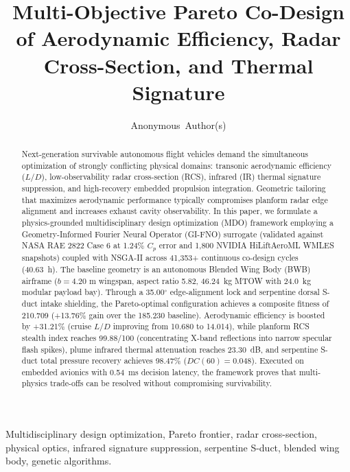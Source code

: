 \documentclass[journal,10pt,twocolumn]{IEEEtran}
\begin{document}
\title{Multi-Objective Pareto Co-Design of Aerodynamic Efficiency, Radar Cross-Section, and Thermal Signature}

\author{Anonymous~Author(s)}


\maketitle

\begin{abstract}
Next-generation survivable autonomous flight vehicles demand the simultaneous optimization of strongly conflicting physical domains: transonic aerodynamic efficiency ($L/D$), low-observability radar cross-section (RCS), infrared (IR) thermal signature suppression, and high-recovery embedded propulsion integration. Geometric tailoring that maximizes aerodynamic performance typically compromises planform radar edge alignment and increases exhaust cavity observability. In this paper, we formulate a physics-grounded multidisciplinary design optimization (MDO) framework employing a Geometry-Informed Fourier Neural Operator (GI-FNO) surrogate (validated against NASA RAE 2822 Case 6 at 1.24\% $C_p$ error and 1,800 NVIDIA HiLiftAeroML WMLES snapshots) coupled with NSGA-II across 41,353+ continuous co-design cycles (40.63~h). The baseline geometry is an autonomous Blended Wing Body (BWB) airframe ($b = 4.20\text{ m}$ wingspan, aspect ratio 5.82, 46.24~kg MTOW with 24.0~kg modular payload bay). Through a 35.00$^\circ$ edge-alignment lock and serpentine dorsal S-duct intake shielding, the Pareto-optimal configuration achieves a composite fitness of 210.709 (+13.76\% gain over the 185.230 baseline). Aerodynamic efficiency is boosted by +31.21\% (cruise $L/D$ improving from 10.680 to 14.014), while planform RCS stealth index reaches 99.88/100 (concentrating X-band reflections into narrow specular flash spikes), plume infrared thermal attenuation reaches 23.30~dB, and serpentine S-duct total pressure recovery achieves 98.47\% ($DC(60) = 0.048$). Executed on embedded avionics with 0.54~ms decision latency, the framework proves that multi-physics trade-offs can be resolved without compromising survivability.
\end{abstract}

\begin{IEEEkeywords}
Multidisciplinary design optimization, Pareto frontier, radar cross-section, physical optics, infrared signature suppression, serpentine S-duct, blended wing body, genetic algorithms.
\end{IEEEkeywords}
\end{document}
